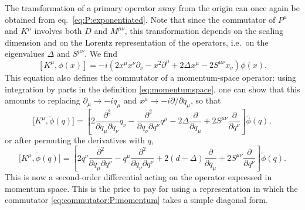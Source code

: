 \documentclass[a4paper,12pt]{article}
\numberwithin{equation}{section}
\begin{document}
The transformation of a primary operator away from the origin can once again be obtained from eq.~\eqref{eq:P:exponentiated}. Note that since the commutator of $P^\mu$ and $K^\mu$ involves both $D$ and $M^{\mu\nu}$, this transformation depends on the scaling dimension and on the Lorentz representation of the operators, i.e.~on the eigenvalues $\Delta$ and $S^{\mu\nu}$. We find
\begin{equation}
	\left[ K^\mu, \phi(x) \right]
	= -i \left( 2 x^\mu x^\nu \partial_\nu - x^2 \partial^\mu 
	+ 2 \Delta x^\mu - 2 S^{\mu\nu} x_\nu \right) \phi(x).
	\label{eq:commutator:K}
\end{equation}
This equation also defines the commutator of a momentum-space operator: using integration by parts in the definition \eqref{eq:momentumspace}, one can show that this amounts to replacing $\partial_\mu \to -i q_\mu$ and $x^\mu \to -i \partial/ \partial q_\mu$,
so that
\begin{equation}
	\big[ K^\mu, \widetilde{\phi}(q) \big]
	= \left[ 2 \frac{\partial^2}{\partial q_\mu \partial q_\nu} q_\nu
	- \frac{\partial^2}{\partial q_\nu \partial q^\nu} q^\mu
	- 2 \Delta \frac{\partial}{\partial q_\mu}
	+ 2 S^{\mu\nu} \frac{\partial}{\partial q^\nu} \right]
	\widetilde{\phi}(q),
\end{equation}
or after permuting the derivatives with $q$,
\begin{equation}
	\big[ K^\mu, \widetilde{\phi}(q) \big]
	= \left[ 2 q^\nu \frac{\partial^2}{\partial q_\mu \partial q^\nu} 
	- q^\mu \frac{\partial^2}{\partial q_\nu \partial q^\nu}
	+ 2 (d - \Delta) \frac{\partial}{\partial q_\mu}
	+ 2 S^{\mu\nu} \frac{\partial}{\partial q^\nu} \right]
	\widetilde{\phi}(q).
\end{equation}
This is now a second-order differential acting on the operator expressed in momentum space. This is the price to pay for using a representation in which the commutator \eqref{eq:commutator:P:momentum} takes a simple diagonal form.
\end{document}
